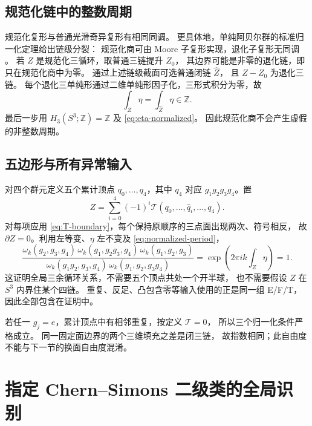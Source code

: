 \documentclass[UTF8,11pt,fontset=none]{ctexart}
\numberwithin{equation}{section}
\theoremstyle{definition}
\newcommand{\Z}{\mathbb Z}
\begin{document}
\subsection{规范化链中的整数周期}

规范化复形与普通光滑奇异复形有相同同调。
更具体地，单纯阿贝尔群的标准归一化定理给出链级分裂：
规范化商可由 Moore 子复形实现，退化子复形无同调
\cite[第 2.1 节，式 (2.1)]{normalization}。
若 $Z$ 是规范化三循环，取普通三链提升 $Z_0$，
其边界可能是非零的退化链，即只在规范化商中为零。
通过上述链级截面可选普通闭链 $\widehat Z$，
且 $\widehat Z-Z_0$ 为退化三链。
每个退化三单纯形通过二维单纯形因子化，三形式积分为零，故
\begin{equation}
 \int_Z\eta=\int_{\widehat Z}\eta\in\Z.
 \label{eq:normalized-period}
\end{equation}
最后一步用 $H_3(S^3;\Z)=\Z$ 及 \eqref{eq:eta-normalized}。
因此规范化商不会产生虚假的非整数周期。

\subsection{五边形与所有异常输入}

对四个群元定义五个累计顶点 $q_0,\ldots,q_4$，其中
$q_4$ 对应 $g_1g_2g_3g_4$。置
\begin{equation}
 Z=\sum_{i=0}^4(-1)^i
 \mathcal T(q_0,\ldots,\widehat q_i,\ldots,q_4).
 \label{eq:five-chain}
\end{equation}
对每项应用 \eqref{eq:T-boundary}，每个保持原顺序的三点面出现两次、符号相反，
故 $\partial Z=0$。利用左等变、$\eta$ 左不变及 \eqref{eq:normalized-period}，
\begin{equation}
 \frac{\omega_k(g_2,g_3,g_4)\,
       \omega_k(g_1,g_2g_3,g_4)\,
       \omega_k(g_1,g_2,g_3)}
      {\omega_k(g_1g_2,g_3,g_4)\,
       \omega_k(g_1,g_2,g_3g_4)}
 =\exp\left(2\pi ik\int_Z\eta\right)=1.
 \label{eq:pentagon}
\end{equation}
这证明全局三余循环关系，不需要五个顶点共处一个开半球，
也不需要假设 $Z$ 在 $S^3$ 内界住某个四链。
重复、反足、凸包含零等输入使用的正是同一组 E/F/T，因此全部包含在证明中。

若任一 $g_j=e$，累计顶点中有相邻重复，按定义 $\mathcal T=0$，
所以三个归一化条件严格成立。
同一固定面边界的两个三维填充之差是闭三链，
故指数相同；此自由度不能与下一节的换面自由度混淆。

\section{指定 Chern--Simons 二级类的全局识别}\label{sec:class}
\end{document}
